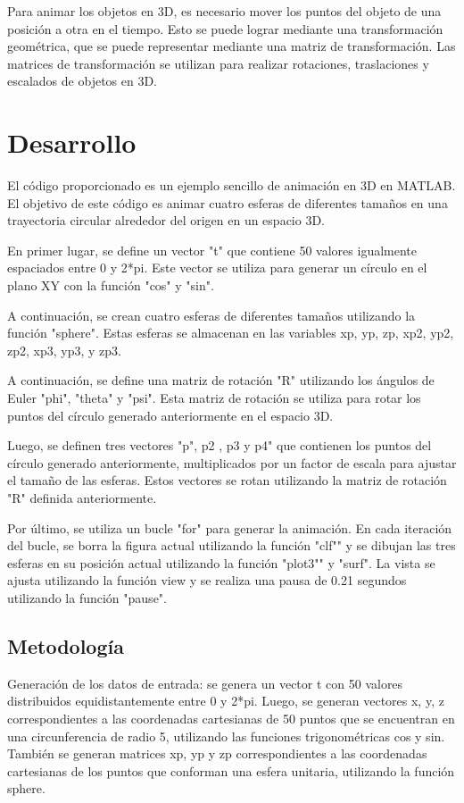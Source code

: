 \documentclass[12pt]{article}
\begin{document}
	Para animar los objetos en 3D, es necesario mover los puntos del objeto de una posición a otra en el tiempo. Esto se puede lograr mediante una transformación geométrica, que se puede representar mediante una matriz de transformación. Las matrices de transformación se utilizan para realizar rotaciones, traslaciones y escalados de objetos en 3D.
	
	\section{Desarrollo}
	El código proporcionado es un ejemplo sencillo de animación en 3D en MATLAB. El objetivo de este código es animar cuatro esferas de diferentes tamaños en una trayectoria circular alrededor del origen en un espacio 3D.
	
	En primer lugar, se define un vector "t" que contiene 50 valores igualmente espaciados entre 0 y 2*pi. Este vector se utiliza para generar un círculo en el plano XY con la función "cos" y "sin".
	
	A continuación, se crean cuatro esferas de diferentes tamaños utilizando la función "sphere". Estas esferas se almacenan en las variables xp, yp, zp, xp2, yp2, zp2, xp3, yp3, y zp3.
	
	A continuación, se define una matriz de rotación "R" utilizando los ángulos de Euler "phi", "theta" y "psi". Esta matriz de rotación se utiliza para rotar los puntos del círculo generado anteriormente en el espacio 3D.
	
	Luego, se definen tres vectores "p", p2 , p3 y p4" que contienen los puntos del círculo generado anteriormente, multiplicados por un factor de escala para ajustar el tamaño de las esferas. Estos vectores se rotan utilizando la matriz de rotación "R" definida anteriormente.
	
	Por último, se utiliza un bucle "for" para generar la animación. En cada iteración del bucle, se borra la figura actual utilizando la función "clf"" y se dibujan las tres esferas en su posición actual utilizando la función "plot3"" y "surf". La vista se ajusta utilizando la función view y se realiza una pausa de 0.21 segundos utilizando la función "pause".
	
	\subsection{Metodología}
	    Generación de los datos de entrada: se genera un vector t con 50 valores distribuidos equidistantemente entre 0 y 2*pi. Luego, se generan vectores x, y, z correspondientes a las coordenadas cartesianas de 50 puntos que se encuentran en una circunferencia de radio 5, utilizando las funciones trigonométricas cos y sin. También se generan matrices xp, yp y zp correspondientes a las coordenadas cartesianas de los puntos que conforman una esfera unitaria, utilizando la función sphere.
	
\end{document}
